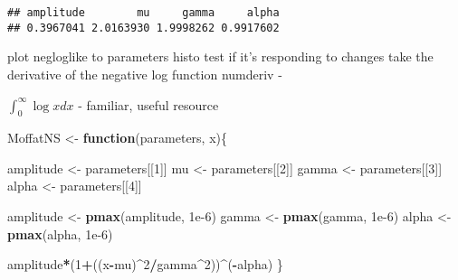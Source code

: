 \documentclass[
]{article}
\newenvironment{Shaded}{\begin{snugshade}}{\end{snugshade}}
\newcommand{\AttributeTok}[1]{\textcolor[rgb]{0.13,0.29,0.53}{#1}}
\newcommand{\CommentTok}[1]{\textcolor[rgb]{0.56,0.35,0.01}{\textit{#1}}}
\newcommand{\ControlFlowTok}[1]{\textcolor[rgb]{0.13,0.29,0.53}{\textbf{#1}}}
\newcommand{\DecValTok}[1]{\textcolor[rgb]{0.00,0.00,0.81}{#1}}
\newcommand{\FloatTok}[1]{\textcolor[rgb]{0.00,0.00,0.81}{#1}}
\newcommand{\FunctionTok}[1]{\textcolor[rgb]{0.13,0.29,0.53}{\textbf{#1}}}
\newcommand{\NormalTok}[1]{#1}
\newcommand{\OtherTok}[1]{\textcolor[rgb]{0.56,0.35,0.01}{#1}}
\newcommand{\SpecialCharTok}[1]{\textcolor[rgb]{0.81,0.36,0.00}{\textbf{#1}}}
\newcommand{\StringTok}[1]{\textcolor[rgb]{0.31,0.60,0.02}{#1}}
\begin{document}
\begin{Shaded}
\end{Shaded}

\begin{verbatim}
## amplitude        mu     gamma     alpha 
## 0.3967041 2.0163930 1.9998262 0.9917602
\end{verbatim}

plot negloglike to parameters histo test if it's responding to changes
take the derivative of the negative log function numderiv -

\(\int_0^\infty \log x dx\) - familiar, useful resource

\begin{Shaded}
\begin{Highlighting}[]
\NormalTok{MoffatNS }\OtherTok{\textless{}{-}} \ControlFlowTok{function}\NormalTok{(parameters, x)\{}

\NormalTok{  amplitude }\OtherTok{\textless{}{-}}\NormalTok{ parameters[[}\DecValTok{1}\NormalTok{]]}
\NormalTok{  mu }\OtherTok{\textless{}{-}}\NormalTok{ parameters[[}\DecValTok{2}\NormalTok{]]}
\NormalTok{  gamma }\OtherTok{\textless{}{-}}\NormalTok{ parameters[[}\DecValTok{3}\NormalTok{]]}
\NormalTok{  alpha }\OtherTok{\textless{}{-}}\NormalTok{ parameters[[}\DecValTok{4}\NormalTok{]]}

\NormalTok{  amplitude }\OtherTok{\textless{}{-}} \FunctionTok{pmax}\NormalTok{(amplitude, }\FloatTok{1e{-}6}\NormalTok{)}
\NormalTok{  gamma }\OtherTok{\textless{}{-}} \FunctionTok{pmax}\NormalTok{(gamma, }\FloatTok{1e{-}6}\NormalTok{)}
\NormalTok{  alpha }\OtherTok{\textless{}{-}} \FunctionTok{pmax}\NormalTok{(alpha, }\FloatTok{1e{-}6}\NormalTok{)}

\NormalTok{  amplitude}\SpecialCharTok{*}\NormalTok{(}\DecValTok{1}\SpecialCharTok{+}\NormalTok{((x}\SpecialCharTok{{-}}\NormalTok{mu)}\SpecialCharTok{\^{}}\DecValTok{2}\SpecialCharTok{/}\NormalTok{gamma}\SpecialCharTok{\^{}}\DecValTok{2}\NormalTok{))}\SpecialCharTok{\^{}}\NormalTok{(}\SpecialCharTok{{-}}\NormalTok{alpha)}
\NormalTok{\}}
\end{Highlighting}
\end{Shaded}
\end{document}
